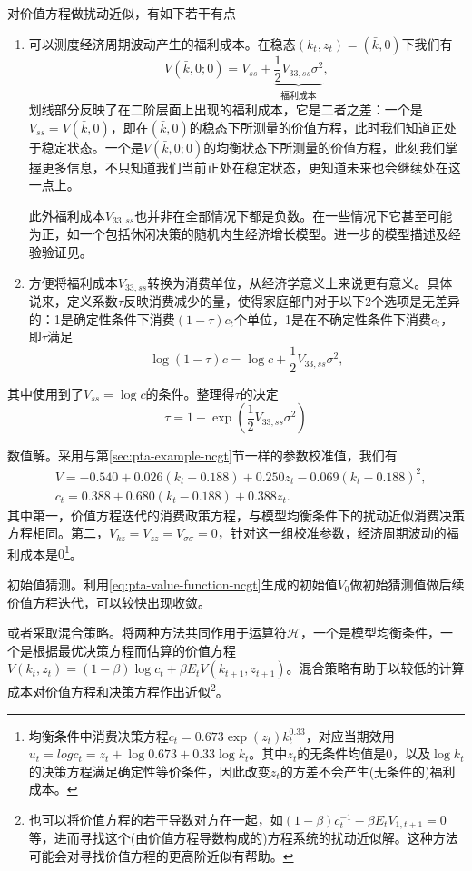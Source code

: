 对价值方程做扰动近似，有如下若干有点
\begin{enumerate}
  \item 可以测度经济周期波动产生的福利成本。在稳态$(k_t,z_t)=(\bar{k},0)$下我们有
  \begin{equation*}
    V(\bar{k},0;0)=V_{ss}+\underbrace{\frac{1}{2}V_{33,ss}\sigma^2}_{\text{福利成本}},
  \end{equation*}
  划线部分反映了在二阶层面上出现的福利成本，它是二者之差：一个是$V_{ss}=V(\bar{k},0)$，即在$(\bar{k},0)$的稳态下所测量的价值方程，此时我们知道正处于稳定状态。一个是$V(\bar{k},0;0)$的均衡状态下所测量的价值方程，此刻我们掌握更多信息，不只知道我们当前正处在稳定状态，更知道未来也会继续处在这一点上。

  此外福利成本$V_{33,ss}$也并非在全部情况下都是负数。在一些情况下它甚至可能为正，如一个包括休闲决策的随机内生经济增长模型。进一步的模型描述及经验验证见\cite{Cho:2015ga}。

  \item 方便将福利成本$V_{33,ss}$转换为消费单位，从经济学意义上来说更有意义。具体说来，定义系数$\tau$反映消费减少的量，使得家庭部门对于以下2个选项是无差异的：1是确定性条件下消费$(1-\tau) c_t$个单位，1是在不确定性条件下消费$c_t$，即$\tau$满足
  \begin{equation*}
    \log (1-\tau) c = \log c + \frac{1}{2} V_{33,ss}\sigma^2,
  \end{equation*}
\end{enumerate}
其中使用到了$V_{ss}=\log c$的条件。整理得$\tau$的决定
\begin{equation}
  \label{eq:pta-tau-value}
  \tau = 1 - \exp(\frac{1}{2} V_{33,ss}\sigma^2)
\end{equation}

数值解。采用与第\ref{sec:pta-example-ncgt}节一样的参数校准值，我们有
\begin{equation}
  \label{eq:pta-value-function-ncgt}
  \begin{split}
    &V = -0.540 + 0.026 ( k_t - 0.188) + 0.250 z_t - 0.069 (k_t - 0.188)^2,\\
    &c_t = 0.388 + 0.680 (k_t - 0.188) + 0.388 z_t.
  \end{split}
\end{equation}
其中第一，价值方程迭代的消费政策方程，与模型均衡条件下的扰动近似消费决策方程相同。第二，$V_{kz}=V_{zz}=V_{\sigma \sigma} =0$，针对这一组校准参数，经济周期波动的福利成本是$0$\footnote{均衡条件中消费决策方程$c_t = 0.673 \exp (z_t) k_t^{0.33}$，对应当期效用$u_t = log c_t = z_t + \log 0.673 + 0.33 \log k_t$。其中$z_t$的无条件均值是$0$，以及$\log k_t$的决策方程满足确定性等价条件，因此改变$z_t$的方差不会产生(无条件的)福利成本。}。

初始值猜测。利用\eqref{eq:pta-value-function-ncgt}生成的初始值$V_0$做初始猜测值做后续价值方程迭代，可以较快出现收敛。

或者采取混合策略。将两种方法共同作用于运算符$\mathcal{H}$，一个是模型均衡条件，一个是根据最优决策方程而估算的价值方程$V(k_t,z_t)= (1-\beta) \log c_t + \beta E_t V(k_{t+1}, z_{t+1})$。混合策略有助于以较低的计算成本对价值方程和决策方程作出近似\footnote{也可以将价值方程的若干导数对方在一起，如$(1-\beta) c_t^{-1} - \beta E_t V_{1,t+1} =0$等，进而寻找这个(由价值方程导数构成的)方程系统的扰动近似解。这种方法可能会对寻找价值方程的更高阶近似有帮助。}。
